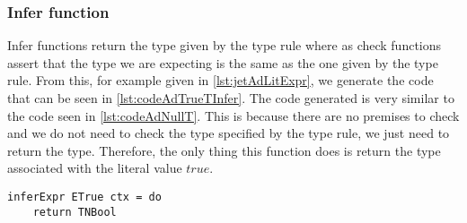 \subsubsection{Infer function}

Infer functions return the type given by the type rule where as check functions assert that the type we are expecting is the same as the one given by the type rule.
From this, for example given in \autoref{lst:jetAdLitExpr}, we generate the code that can be seen in \autoref{lst:codeAdTrueTInfer}.
The code generated is very similar to the code seen in \autoref{lst:codeAdNullT}.
This is because there are no premises to check and we do not need to check the type specified by the type rule, we just need to return the type.
Therefore, the only thing this function does is return the type associated with the literal value $true$.

\begin{lstlisting}[caption = Code generated for inferExpr from AdTrueT, label=lst:codeAdTrueTInfer]
inferExpr ETrue ctx = do
    return TNBool
\end{lstlisting}